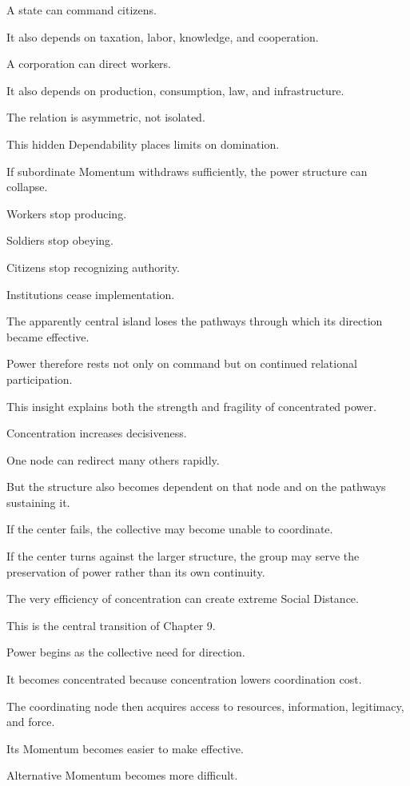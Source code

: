 A state can command citizens.

It also depends on taxation, labor, knowledge, and cooperation.

A corporation can direct workers.

It also depends on production, consumption, law, and infrastructure.

The relation is asymmetric, not isolated.

This hidden Dependability places limits on domination.

If subordinate Momentum withdraws sufficiently, the power structure can collapse.

Workers stop producing.

Soldiers stop obeying.

Citizens stop recognizing authority.

Institutions cease implementation.

The apparently central island loses the pathways through which its direction became effective.

Power therefore rests not only on command but on continued relational participation.

This insight explains both the strength and fragility of concentrated power.

Concentration increases decisiveness.

One node can redirect many others rapidly.

But the structure also becomes dependent on that node and on the pathways sustaining it.

If the center fails, the collective may become unable to coordinate.

If the center turns against the larger structure, the group may serve the preservation of power rather than its own continuity.

The very efficiency of concentration can create extreme Social Distance.

This is the central transition of Chapter 9.

Power begins as the collective need for direction.

It becomes concentrated because concentration lowers coordination cost.

The coordinating node then acquires access to resources, information, legitimacy, and force.

Its Momentum becomes easier to make effective.

Alternative Momentum becomes more difficult.

